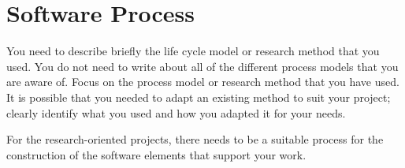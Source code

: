 \section{Software Process}
You need to describe briefly the life cycle model or research method that you used. You do not need to write about all of the different process models that you are aware of. Focus on the process model or research method that you have used. It is possible that you needed to adapt an existing method to suit your project; clearly identify what you used and how you adapted it for your needs.

For the research-oriented projects, there needs to be a suitable process for the construction of the software elements that support your work.
